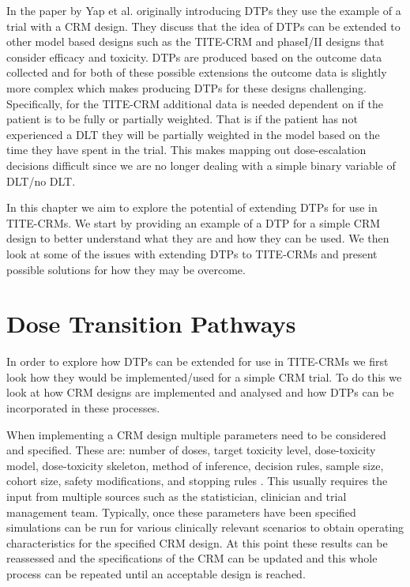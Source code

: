 In the paper by Yap et al. \cite{yapDoseTransitionPathways2017} originally introducing DTPs they use the example of a trial with a CRM design. They discuss that the idea of DTPs can be extended to other model based designs such as the TITE-CRM and phase\RN{1}/\RN{2} designs that consider efficacy and toxicity. DTPs are produced based on the outcome data collected and for both of these possible extensions the outcome data is slightly more complex which makes producing DTPs for these designs challenging. Specifically, for the TITE-CRM additional data is needed dependent on if the patient is to be fully or partially weighted. That is if the patient has not experienced a DLT they will be partially weighted in the model based on the time they have spent in the trial. This makes mapping out dose-escalation decisions difficult since we are no longer dealing with a simple binary variable of DLT/no DLT. 

In this chapter we aim to explore the potential of extending DTPs for use in TITE-CRMs. We start by providing an example of a DTP for a simple CRM design to better understand what they are and how they can be used. We then look at some of the issues with extending DTPs to TITE-CRMs and present possible solutions for how they may be overcome.



\section{Dose Transition Pathways}
\label{tite-dtp:DTPs}

In order to explore how DTPs can be extended for use in TITE-CRMs we first look how they would be implemented/used for a simple CRM trial. To do this we look at how CRM designs are implemented and analysed and how DTPs can be incorporated in these processes. 

When implementing a CRM design multiple parameters need to be considered and specified. These are: number of doses, target toxicity level, dose-toxicity model, dose-toxicity skeleton, method of inference, decision rules, sample size, cohort size, safety modifications, and stopping rules \cite{wheelerHowDesignDosefinding2019}. This usually requires the input from multiple sources such as the statistician, clinician and trial management team. Typically, once these parameters have been specified simulations can be run for various clinically relevant scenarios to obtain operating characteristics for the specified CRM design. At this point these results can be reassessed and the specifications of the CRM can be updated  and this whole process can be repeated until an acceptable design is reached. 

